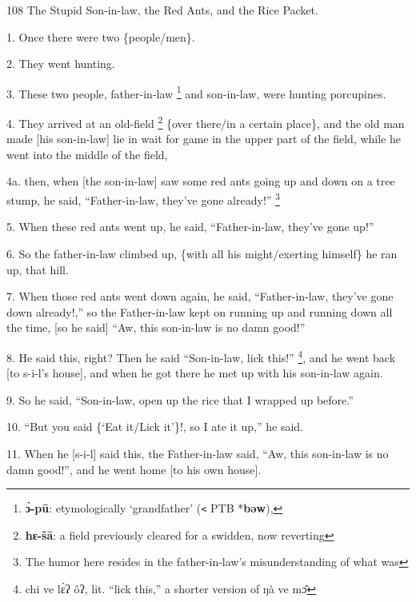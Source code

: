 
108 The Stupid Son-in-law, the Red Ants, and the Rice Packet.

1. Once there were two \{people/men\}.

2. They went hunting.

3. These two people, father-in-law \footnote{\textbf{ɔ̀-pū}: etymologically `grandfather' (\texttt{<} PTB *\textbf{bəw}),} and son-in-law, were hunting porcupines.

4. They arrived at an old-field \footnote{\textbf{hɛ-šā}: a field previously cleared for a swidden, now reverting} \{over there/in a certain place\}, and the
old man made [his son-in-law] lie in wait for game in the upper part of the field,
while he went into the middle of the field,

4a. then, when [the son-in-law] saw some red ants going up and down on a tree stump,
he said, ``Father-in-law, they've gone already!'' \footnote{The humor here resides in the father-in-law's misunderstanding of what was}

5. When these red ants went up, he said, ``Father-in-law, they've gone up!''

6. So the father-in-law climbed up, \{with all his might/exerting himself\} he
ran up, that hill.

7. When those red ants went down again, he said, ``Father-in-law, they've gone
down already!,'' so the Father-in-law kept on running up and running down all the
time, [so he said] ``Aw, this son-in-law is no damn good!''

8. He said this, right? Then he said ``Son-in-law, lick this!'' \footnote{chi ve lɛ̀ʔ ôʔ, lit. ``lick this,'' a shorter version of ŋà ve mɔ̂}, and he went
back [to s-i-l's house], and when he got there he met up with his son-in-law again.

9. So he said, ``Son-in-law, open up the rice that I wrapped up before.''

10. ``But you said \{`Eat it/Lick it'\}!, so I ate it up,'' he said.

11. When he [s-i-l] said this, the Father-in-law said, ``Aw, this son-in-law is
no damn good!'', and he went home [to his own house].

